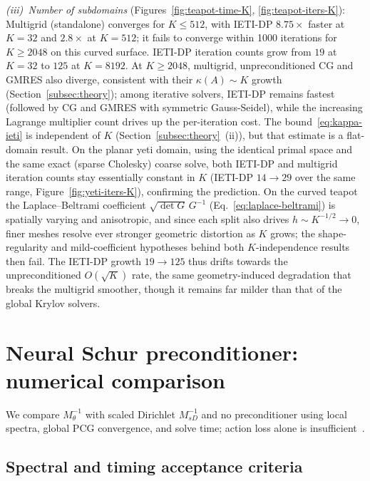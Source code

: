 \documentclass{article}
\newcommand{\Psd}{M_{sD}^{-1}}                   %
\newcommand{\Pneural}{M_{\theta}^{-1}}            %
\theoremstyle{plain}
\numberwithin{equation}{section}
\begin{document}
\emph{(iii)~Number of subdomains} (Figures~\ref{fig:teapot-time-K},
\ref{fig:teapot-iters-K}):
Multigrid (standalone) converges for $K\leq 512$, with IETI-DP $8.75\times$
faster at $K=32$ and $2.8\times$ at $K=512$; it fails to converge within
1000 iterations for $K\geq 2048$ on this curved surface.
IETI-DP iteration counts grow from $19$ at $K=32$ to $125$ at $K=8192$.
At $K\geq 2048$, multigrid, unpreconditioned CG and GMRES also diverge,
consistent with their $\kappa(A)\sim K$ growth (Section~\ref{subsec:theory});
among iterative solvers, IETI-DP remains fastest (followed by CG and GMRES
with symmetric Gauss-Seidel), while the increasing Lagrange multiplier count
drives up the per-iteration cost.
The bound~\eqref{eq:kappa-ieti} is independent of $K$
(Section~\ref{subsec:theory}~(ii)), but that estimate is a flat-domain result.
On the planar yeti domain, using the identical primal space and the same exact
(sparse Cholesky) coarse solve, both IETI-DP and multigrid iteration counts stay
essentially constant in $K$ (IETI-DP $14\!\to\!29$ over the same range,
Figure~\ref{fig:yeti-iters-K}), confirming the prediction. On the curved teapot
the Laplace--Beltrami coefficient $\sqrt{\det G}\,G^{-1}$
(Eq.~\eqref{eq:laplace-beltrami}) is spatially varying and anisotropic, and since
each split also drives $h\sim K^{-1/2}\to 0$, finer meshes resolve ever stronger
geometric distortion as $K$ grows; the shape-regularity and mild-coefficient
hypotheses behind both $K$-independence results then fail. The IETI-DP growth
$19\!\to\!125$ thus drifts towards the unpreconditioned $O(\sqrt{K})$ rate, the
same geometry-induced degradation that breaks the multigrid smoother, though it
remains far milder than that of the global Krylov solvers.


\clearpage
\section{Neural Schur preconditioner: numerical comparison}
\label{sec:nn-comparison}

We compare $\Pneural$ with scaled Dirichlet $\Psd$ and no preconditioner using
local spectra, global PCG convergence, and solve time; action loss alone is
insufficient~\cite{wu2026dlhim}.

\subsection{Spectral and timing acceptance criteria}
\end{document}
